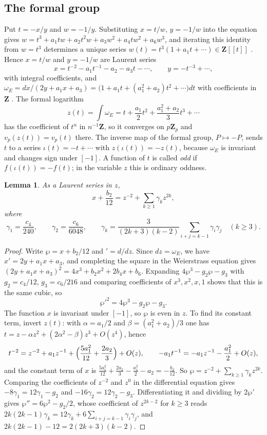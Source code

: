 \documentclass[11pt]{amsart}
\newtheorem{lemma}[theorem]{Lemma}
\theoremstyle{definition}
\newcommand{\Z}{\mathbf{Z}}
\newcommand{\Zp}{\mathbf{Z}_p}
\begin{document}
\subsection{The formal group}
Put $t=-x/y$ and $w=-1/y$. Substituting $x=t/w$, $y=-1/w$ into the equation gives $w=t^3+a_1tw+a_2t^2w+a_3w^2+a_4tw^2+a_6w^3$, and iterating this identity from $w=t^3$ determines a unique series $w(t)=t^3(1+a_1t+\cdots)\in\Z[[t]]$ \cite[Ch.~IV, Prop.~1.1]{Sil09}. Hence $x=t/w$ and $y=-1/w$ are Laurent series
\[
x=t^{-2}-a_1t^{-1}-a_2-a_3t-\cdots,\qquad y=-t^{-3}+\cdots,
\]
with integral coefficients, and $\omega_E=dx/(2y+a_1x+a_3)=\bigl(1+a_1t+(a_1^2+a_2)t^2+\cdots\bigr)dt$ with coefficients in $\Z$ \cite[Ch.~IV, Prop.~1.1 and \S4]{Sil09}. The formal logarithm
\[
z(t)=\int\omega_E=t+\frac{a_1}2t^2+\frac{a_1^2+a_2}3t^3+\cdots
\]
has the coefficient of $t^n$ in $n^{-1}\Z$, so it converges on $p\Zp$ and $v_p(z(t))=v_p(t)$ there. The inverse map of the formal group, $P\mapsto-P$, sends $t$ to a series $\iota(t)=-t+\cdots$ with $z(\iota(t))=-z(t)$, because $\omega_E$ is invariant and changes sign under $[-1]$. A function of $t$ is called \emph{odd} if $f(\iota(t))=-f(t)$; in the variable $z$ this is ordinary oddness.

\begin{lemma}\label{lem:wp}
As a Laurent series in $z$,
\[
x+\frac{b_2}{12}=z^{-2}+\sum_{k\ge1}\gamma_kz^{2k},
\]
where
\[
\gamma_1=\frac{c_4}{240},\qquad\gamma_2=\frac{c_6}{6048},\qquad\gamma_k=\frac{3}{(2k+3)(k-2)}\sum_{i+j=k-1}\gamma_i\gamma_j\quad(k\ge3).
\]
\end{lemma}

\begin{proof}
Write $\wp=x+b_2/12$ and $'=d/dz$. Since $dz=\omega_E$, we have $x'=2y+a_1x+a_3$, and completing the square in the Weierstrass equation gives $(2y+a_1x+a_3)^2=4x^3+b_2x^2+2b_4x+b_6$. Expanding $4\wp^3-g_2\wp-g_3$ with $g_2=c_4/12$, $g_3=c_6/216$ and comparing coefficients of $x^3,x^2,x,1$ shows that this is the same cubic, so
\[
\wp'^2=4\wp^3-g_2\wp-g_3 .
\]
The function $x$ is invariant under $[-1]$, so $\wp$ is even in $z$. To find its constant term, invert $z(t)$: with $\alpha=a_1/2$ and $\beta=(a_1^2+a_2)/3$ one has $t=z-\alpha z^2+(2\alpha^2-\beta)z^3+O(z^4)$, hence
\[
t^{-2}=z^{-2}+a_1z^{-1}+\Bigl(\frac{5a_1^2}{12}+\frac{2a_2}3\Bigr)+O(z),\qquad -a_1t^{-1}=-a_1z^{-1}-\frac{a_1^2}2+O(z),
\]
and the constant term of $x$ is $\frac{5a_1^2}{12}+\frac{2a_2}{3}-\frac{a_1^2}{2}-a_2=-\frac{b_2}{12}$. So $\wp=z^{-2}+\sum_{k\ge1}\gamma_kz^{2k}$. Comparing the coefficients of $z^{-2}$ and $z^0$ in the differential equation gives $-8\gamma_1=12\gamma_1-g_2$ and $-16\gamma_2=12\gamma_2-g_3$. Differentiating it and dividing by $2\wp'$ gives $\wp''=6\wp^2-g_2/2$, whose coefficient of $z^{2k-2}$ for $k\ge3$ reads $2k(2k-1)\gamma_k=12\gamma_k+6\sum_{i+j=k-1}\gamma_i\gamma_j$, and $2k(2k-1)-12=2(2k+3)(k-2)$.
\end{proof}
\end{document}
